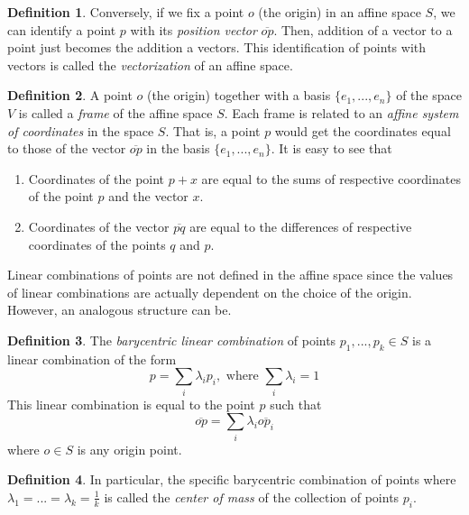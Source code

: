 \documentclass{article}
\theoremstyle{remark}
\theoremstyle{definition}
\newtheorem{definition}{Definition}[section]
\begin{document}
\begin{definition}
Conversely, if we fix a point $o$ (the origin) in an affine space $S$, we can identify a point $p$ with its \textit{position vector} $\overline{op}$. Then, addition of a vector to a point just becomes the addition a vectors. This identification of points with vectors is called the \textit{vectorization} of an affine space. 
\end{definition}

\begin{definition}
A point $o$ (the origin) together with a basis $\{e_1, ..., e_n\}$ of the space $V$ is called a \textit{frame} of the affine space $S$. Each frame is related to an \textit{affine system of coordinates} in the space $S$. That is, a point $p$ would get the coordinates equal to those of the vector $\overline{op}$ in the basis $\{e_1, ..., e_n\}$. It is easy to see that 
\begin{enumerate}
    \item Coordinates of the point $p+x$ are equal to the sums of respective coordinates of the point $p$ and the vector $x$. 
    \item Coordinates of the vector $\overline{pq}$ are equal to the differences of respective coordinates of the points $q$ and $p$. 
\end{enumerate}
\end{definition}

Linear combinations of points are not defined in the affine space since the values of linear combinations are actually dependent on the choice of the origin. However, an analogous structure can be. 

\begin{definition}
The \textit{barycentric linear combination} of points $p_1, ..., p_k \in S$ is a linear combination of the form
\[p = \sum_i \lambda_i p_i, \text{ where } \sum_i \lambda_i = 1\]
This linear combination is equal to the point $p$ such that
\[\overline{op} = \sum_i \lambda_i \overline{op_i}\]
where $o \in S$ is any origin point.
\end{definition}

\begin{definition}
In particular, the specific barycentric combination of points where $\lambda_1 = ... = \lambda_k = \frac{1}{k}$ is called the \textit{center of mass} of the collection of points $p_i$. 
\end{definition}
\end{document}
